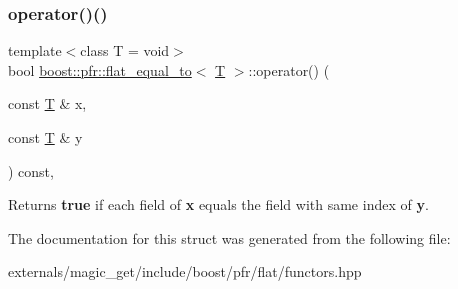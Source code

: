 \subsubsection{\texorpdfstring{operator()()}{operator()()}}
{\footnotesize\ttfamily template$<$class T  = void$>$ \\
bool \mbox{\hyperlink{structboost_1_1pfr_1_1flat__equal__to}{boost\+::pfr\+::flat\+\_\+equal\+\_\+to}}$<$ \mbox{\hyperlink{struct_t}{T}} $>$\+::operator() (\begin{DoxyParamCaption}\item[{const \mbox{\hyperlink{struct_t}{T}} \&}]{x,  }\item[{const \mbox{\hyperlink{struct_t}{T}} \&}]{y }\end{DoxyParamCaption}) const\hspace{0.3cm}{\ttfamily [inline]}, {\ttfamily [noexcept]}}

\begin{DoxyReturn}{Returns}
{\bfseries true} if each field of {\bfseries x} equals the field with same index of {\bfseries y}.
\end{DoxyReturn}


The documentation for this struct was generated from the following file\+:\begin{DoxyCompactItemize}
\item 
externals/magic\+\_\+get/include/boost/pfr/flat/functors.\+hpp\end{DoxyCompactItemize}
